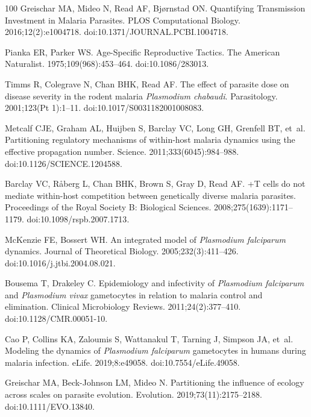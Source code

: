 \documentclass[10pt,letterpaper]{article}
\begin{document}
\begin{thebibliography}{100}
Greischar MA, Mideo N, Read AF, Bjørnstad ON.
\newblock Quantifying {Transmission} {Investment} in {Malaria} {Parasites}.
\newblock PLOS Computational Biology. 2016;12(2):e1004718.
\newblock doi:{10.1371/JOURNAL.PCBI.1004718}.

Pianka ER, Parker WS.
\newblock Age-{Specific} {Reproductive} {Tactics}.
\newblock The American Naturalist. 1975;109(968):453--464.
\newblock doi:{10.1086/283013}.

Timms R, Colegrave N, Chan BHK, Read AF.
\newblock The effect of parasite dose on disease severity in the rodent malaria \textit{{Plasmodium} chabaudi}.
\newblock Parasitology. 2001;123(Pt 1):1--11.
\newblock doi:{10.1017/S0031182001008083}.

Metcalf CJE, Graham AL, Huijben S, Barclay VC, Long GH, Grenfell BT, et~al.
\newblock Partitioning regulatory mechanisms of within-host malaria dynamics using the effective propagation number.
\newblock Science. 2011;333(6045):984--988.
\newblock doi:{10.1126/SCIENCE.1204588}.

Barclay VC, Råberg L, Chan BHK, Brown S, Gray D, Read AF.
+{T} cells do not mediate within-host competition between genetically diverse malaria parasites.
\newblock Proceedings of the Royal Society B: Biological Sciences. 2008;275(1639):1171--1179.
\newblock doi:{10.1098/rspb.2007.1713}.

McKenzie FE, Bossert WH.
\newblock An integrated model of \textit{{Plasmodium} falciparum} dynamics.
\newblock Journal of Theoretical Biology. 2005;232(3):411--426.
\newblock doi:{10.1016/j.jtbi.2004.08.021}.

Bousema T, Drakeley C.
\newblock Epidemiology and infectivity of \textit{{Plasmodium} falciparum} and \textit{{Plasmodium} vivax} gametocytes in relation to malaria control and elimination.
\newblock Clinical Microbiology Reviews. 2011;24(2):377--410.
\newblock doi:{10.1128/CMR.00051-10}.

Cao P, Collins KA, Zaloumis S, Wattanakul T, Tarning J, Simpson JA, et~al.
\newblock Modeling the dynamics of \textit{{Plasmodium} falciparum} gametocytes in humans during malaria infection.
\newblock eLife. 2019;8:e49058.
\newblock doi:{10.7554/eLife.49058}.

Greischar MA, Beck-Johnson LM, Mideo N.
\newblock Partitioning the influence of ecology across scales on parasite evolution.
\newblock Evolution. 2019;73(11):2175--2188.
\newblock doi:{10.1111/EVO.13840}.


\end{thebibliography}
\end{document}
